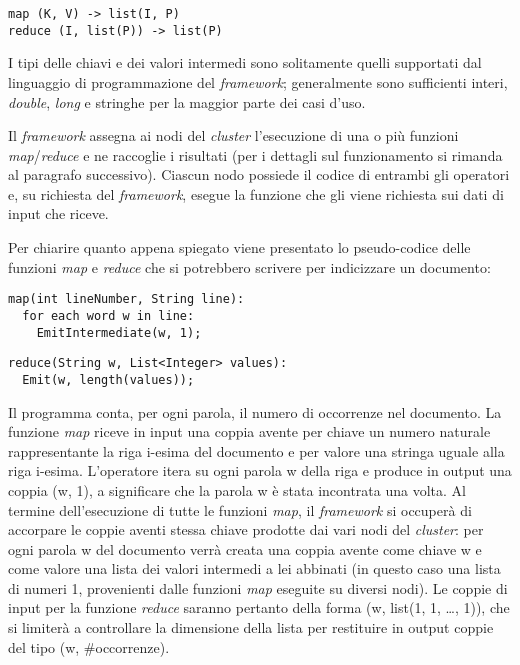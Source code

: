 \begin{lstlisting}[frame=single]
map (K, V) -> list(I, P)
reduce (I, list(P)) -> list(P)
\end{lstlisting}

I tipi delle chiavi e dei valori intermedi sono solitamente quelli supportati dal linguaggio di programmazione del \textit{framework}; generalmente sono sufficienti interi, \textit{double}, \textit{long} 
e stringhe per la maggior parte dei casi d’uso.

Il \textit{framework} assegna ai nodi del \textit{cluster} l’esecuzione di una o più funzioni \textit{map}/\textit{reduce} e ne raccoglie i risultati (per i dettagli sul funzionamento si rimanda al paragrafo successivo).
Ciascun nodo possiede il codice di entrambi gli operatori e, su richiesta del \textit{framework}, esegue la funzione che gli viene richiesta sui dati di input che riceve.

Per chiarire quanto appena spiegato viene presentato lo pseudo-codice delle funzioni \textit{map} e \textit{reduce} che si potrebbero scrivere per indicizzare un documento:

\begin{lstlisting}[frame=single]
map(int lineNumber, String line):
  for each word w in line:
    EmitIntermediate(w, 1);
\end{lstlisting}

\begin{lstlisting}[frame=single]
reduce(String w, List<Integer> values):
  Emit(w, length(values));
\end{lstlisting}

Il programma conta, per ogni parola, il numero di occorrenze nel documento. La funzione \textit{map} riceve in input una coppia avente per chiave un numero naturale rappresentante la 
riga i-esima del documento e per valore una stringa uguale alla riga i-esima. L’operatore itera su ogni parola w della riga e produce in output una coppia (w, 1), a significare 
che la parola w è stata incontrata una volta. Al termine dell’esecuzione di tutte le funzioni \textit{map}, il \textit{framework} si occuperà di accorpare le coppie aventi stessa chiave prodotte 
dai vari nodi del \textit{cluster}: per ogni parola w del documento verrà creata una coppia avente come chiave w e come valore una lista dei valori intermedi a lei abbinati (in questo 
caso una lista di numeri 1, provenienti dalle funzioni \textit{map} eseguite su diversi nodi). Le coppie di input per la funzione \textit{reduce} saranno pertanto della forma (w, list(1, 1, …, 1)),
che si limiterà a controllare la dimensione della lista per restituire in output coppie del tipo (w, \#occorrenze). 

